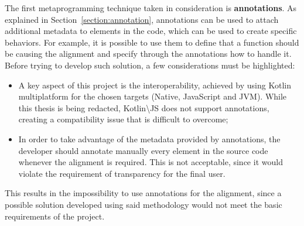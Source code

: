 The first metaprogramming technique taken in consideration is \textbf{annotations}. As explained in Section~\ref{section:annotation}, annotations can be used to attach additional metadata to elements in the code, which can be used to create specific behaviors. For example, it is possible to use them to define that a function should be causing the alignment and specify through the annotations how to handle it.\newline
Before trying to develop such solution, a few considerations must be highlighted:
\begin{itemize}
    \item A key aspect of this project is the interoperability, achieved by using Kotlin multiplatform for the chosen targets (Native, JavaScript and JVM). While this thesis is being redacted, Kotlin\textbackslash JS does not support annotations, creating a compatibility issue that is difficult to overcome;
    \item In order to take advantage of the metadata provided by annotations, the developer should annotate manually every element in the source code whenever the alignment is required. This is not acceptable, since it would violate the requirement of transparency for the final user.
\end{itemize}
This results in the impossibility to use annotations for the alignment, since a possible solution developed using said methodology would not meet the basic requirements of the project.

